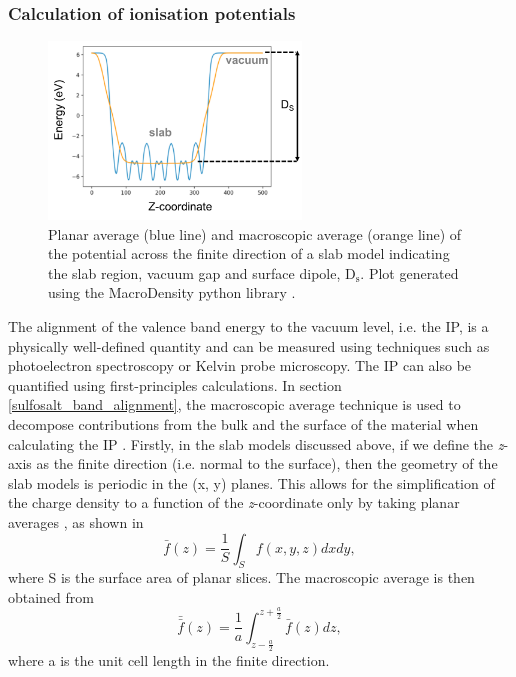 \documentclass[11pt, twoside]{report}
\begin{document}
\subsubsection{Calculation of ionisation potentials}

\begin{figure}[h!]
  \centering
    \includegraphics[width=0.6\textwidth]{figures/MD_eg.png}
    \caption[Planar average (blue line) and macroscopic average (orange line) of the potential across the finite direction of a slab model indicating the slab region, vacuum gap and surface dipole, $\mathrm{D_s}$.]{Planar average (blue line) and macroscopic average (orange line) of the potential across the finite direction of a slab model indicating the slab region, vacuum gap and surface dipole, $\mathrm{D_s}$. Plot generated using the MacroDensity python library \cite{MacroDensity}.}
  \label{MD_eg}
\end{figure}

The alignment of the valence band energy to the vacuum level, i.e. the IP, is a physically well-defined quantity and can be measured using techniques such as photoelectron spectroscopy or Kelvin probe microscopy. The IP can also be quantified using first-principles calculations. In section \ref{sulfosalt_band_alignment}, the macroscopic average technique is used to decompose contributions from the bulk and the surface of the material when calculating the IP \cite{macro_pot_IP}.
Firstly, in the slab models discussed above, if we define the \textit{z}-axis as the finite direction (i.e. normal to the surface), then the geometry of the slab models is periodic in the (x, y) planes. This allows for the simplification of the charge density to a function of the \textit{z}-coordinate only by taking planar averages \cite{band_engineering}, as shown in
\begin{equation}\label{planar_av}
\bar{f}(z) = \frac{1}{S}\int_S f(x,y,z)dxdy,
\end{equation}
where S is the surface area of planar slices.
The macroscopic average is then obtained from
\begin{equation}\label{macro_av}
\bar{\bar{f}}(z) = \frac{1}{a} \int_{z-\frac{a}{2}}^{z+\frac{a}{2}}  \bar{f}(z) dz,
\end{equation}
where a is the unit cell length in the finite direction.
\end{document}
